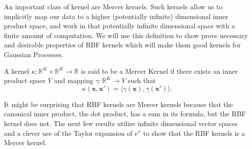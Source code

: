 An important class of kernel are Mercer kernels.
Such kernels allow us to implicitly map our data to a higher (potentially infinite) dimensional inner product space, and work in that potentially infinite dimensional space with a finite amount of computation.
We will use this definition to show prove necessary and desirable properties of RBF kernels which will make them good kernels for Gaussian Processes.

\begin{definition}
    A kernel $\kappa: \mathbb{R}^{K} \times \mathbb{R}^{K} \to \mathbb{R}$
    is said to be a Mercer Kernel if there exists an inner product space
    $V$ and mapping $\gamma : \mathbb{R}^{K} \to V$ such that
    \begin{equation*}
        \kappa(\mathbf{x}, \mathbf{x}') = \langle \gamma(\mathbf{x}), \gamma(\mathbf{x}') \rangle.
    \end{equation*}
\end{definition}

It might be surprising that RBF kernels are Mercer kernels because that the canonical inner product, the dot product, has a sum in its formula, but the RBF kernel does not.
The next few results utilize infinite dimensional vector spaces and a clever use of the Taylor expansion of $e^{x}$ to show that the RBF kernels is a Mercer kernel.

